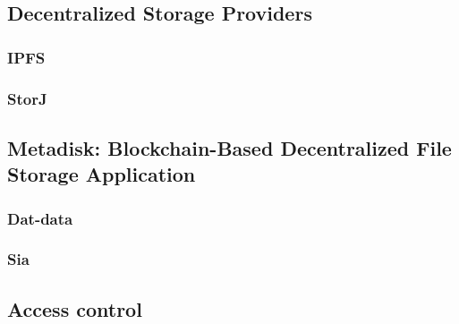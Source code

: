 \subsection{Decentralized Storage Providers}

\subsubsection{IPFS}

\subsubsection{StorJ}
\subsection{Metadisk: Blockchain-Based Decentralized File Storage Application}

\subsubsection{Dat-data}

\subsubsection{Sia}

\subsection{Access control}

